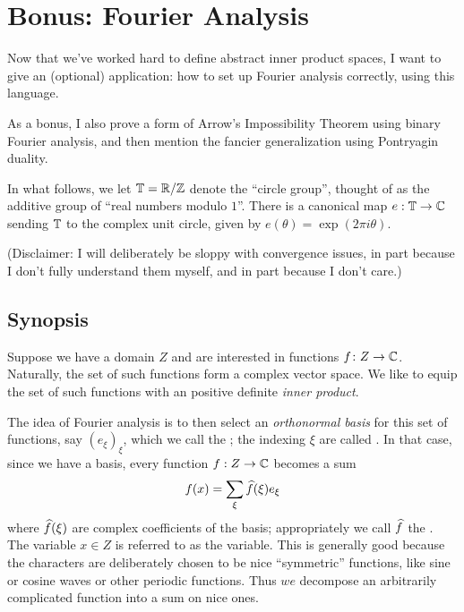 \chapter{Bonus: Fourier Analysis}
Now that we've worked hard to define abstract inner product spaces,
I want to give an (optional) application:
how to set up Fourier analysis correctly, using this language.

As a bonus, I also prove a form of Arrow's Impossibility Theorem
using binary Fourier analysis,
and then mention the fancier generalization using Pontryagin duality.

In what follows, we let $\mathbb T = \mathbb R/\mathbb Z$ denote the ``circle group'',
thought of as the additive group of ``real numbers modulo $1$''.
There is a canonical map $e : \mathbb T \to \mathbb C$ sending $\mathbb T$ to the
complex unit circle, given by $e(\theta) = \exp(2\pi i \theta)$.

(Disclaimer: I will deliberately be sloppy with convergence issues,
in part because I don't fully understand them myself,
and in part because I don't care.)

\section{Synopsis}
Suppose we have a domain $Z$ and are interested in functions $f \colon Z \to \mathbb C$.
Naturally, the set of such functions form a complex vector space.
We like to equip the set of such functions
with an positive definite \emph{inner product}.

The idea of Fourier analysis is to then select an \emph{orthonormal basis}
for this set of functions, say $(e_\xi)_{\xi}$,
which we call the ;
the indexing $\xi$ are called .
In that case, since we have a basis, every function $f : Z \to \mathbb C$
becomes a sum
\[ f(x) = \sum_{\xi} \widehat f(\xi) e_\xi \]
where $\widehat f(\xi)$ are complex coefficients of the basis;
appropriately we call $\widehat f$ the .
The variable $x \in Z$ is referred to as the  variable.
This is generally good because the characters are deliberately chosen
to be nice ``symmetric'' functions,
like sine or cosine waves or other periodic functions.
Thus $we$ decompose an arbitrarily complicated function into a sum on nice ones.

